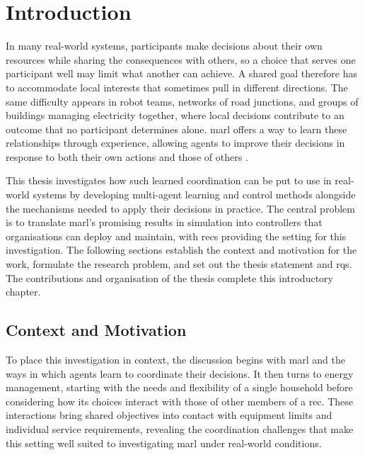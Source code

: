 \chapter{Introduction}
\label{chap:introduction}
\makeatletter
\let\introductionoriginaltextbottom\@textbottom
\let\introductionoriginaltexttop\@texttop
\makeatother
\raggedbottom
\newlength{\introductionoriginalparskip}
\setlength{\introductionoriginalparskip}{\parskip}
\setlength{\parskip}{0pt}
\edef\introductionoriginalclubpenalty{\the\clubpenalty}
\edef\introductionoriginalwidowpenalty{\the\widowpenalty}

In many real-world systems, participants make decisions about their own resources while sharing the consequences with others, so a choice that serves one participant well may limit what another can achieve. A shared goal therefore has to accommodate local interests that sometimes pull in different directions. The same difficulty appears in robot teams, networks of road junctions, and groups of buildings managing electricity together, where local decisions contribute to an outcome that no participant determines alone. \gls{marl} offers a way to learn these relationships through experience, allowing agents to improve their decisions in response to both their own actions and those of others \parencite{gronauer2022survey,keren2024energynetworks}.

This thesis investigates how such learned coordination can be put to use in real-world systems by developing multi-agent learning and control methods alongside the mechanisms needed to apply their decisions in practice. The central problem is to translate \gls{marl}'s promising results in simulation into controllers that organisations can deploy and maintain, with \glspl{rec} providing the setting for this investigation. The following sections establish the context and motivation for the work, formulate the research problem, and set out the thesis statement and \glspl{rq}. The contributions and organisation of the thesis complete this introductory chapter.

\section{Context and Motivation}
\label{sec:intro-context}

To place this investigation in context, the discussion begins with \gls{marl} and the ways in which agents learn to coordinate their decisions. It then turns to energy management, starting with the needs and flexibility of a single household before considering how its choices interact with those of other members of a \gls{rec}. These interactions bring shared objectives into contact with equipment limits and individual service requirements, revealing the coordination challenges that make this setting well suited to investigating \gls{marl} under real-world conditions.


